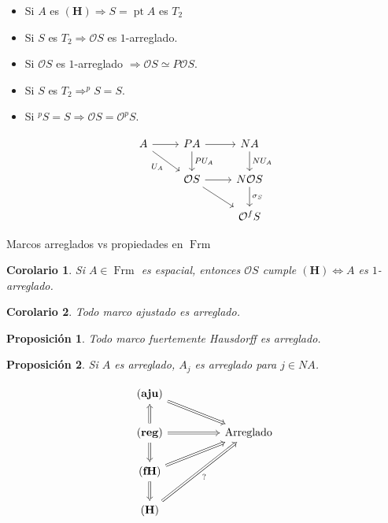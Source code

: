 \documentclass[compress,12pt]{beamer}
\DeclareMathOperator{\pt}{pt}
\DeclareMathOperator{\Frm}{Frm}
\newtheorem{cor}{Corolario}
\newtheorem{prop}{Proposición}
\begin{document}
\begin{frame}[fragile]
\begin{itemize}
\item Si $A$ es $\mathbf{(H)}\Rightarrow S=\pt A$ es $T_2$
\item Si $S$ es $T_2\Rightarrow \mathcal{O}S$ es $1$-arreglado.
\item Si $\mathcal{O}S$ es $1$-arreglado $\Rightarrow \mathcal{O}S\simeq P\mathcal{O}S$.
\item Si $S$ es $T_2\Rightarrow ^pS=S$.
\item Si $^pS=S\Rightarrow \mathcal{O}S=\mathcal{O}^pS$.
\end{itemize}
\[\begin{tikzcd}
	A & PA & NA \\
	& {\mathcal{O}S} & {N\mathcal{O}S} \\
	&& {\mathcal{O}^fS}
	\arrow[from=1-1, to=1-2]
	\arrow["{U_A}"', from=1-1, to=2-2]
	\arrow[from=1-2, to=1-3]
	\arrow["{PU_A}", from=1-2, to=2-2]
	\arrow["{NU_A}", from=1-3, to=2-3]
	\arrow[from=2-2, to=2-3]
	\arrow[from=2-2, to=3-3]
	\arrow["{\sigma_S}", from=2-3, to=3-3]
\end{tikzcd}\]
\end{frame}

\begin{frame}{Marcos arreglados vs propiedades en $\Frm$}
\begin{cor}
Si $A\in \Frm$ es espacial, entonces $\mathcal{O}S$ cumple $\mathbf{(H)}\Leftrightarrow A$ es $1$-arreglado.
\end{cor}

\begin{cor}
	Todo marco ajustado es arreglado.
\end{cor}

\begin{prop}
Todo marco fuertemente Hausdorff es arreglado.
\end{prop}

\begin{prop}
Si $A$ es arreglado, $A_j$ es arreglado para $j\in NA$.
\end{prop}

\end{frame}

\begin{frame}[fragile]
\[\begin{tikzcd}
	{\mathbf{(aju)}} \\
	{\mathbf{(reg)}} && {\mbox{Arreglado}} \\
	{\mathbf{(fH)}} \\
	{\mathbf{(H)}}
	\arrow[Rightarrow, from=1-1, to=2-3]
	\arrow[Rightarrow, from=2-1, to=1-1]
	\arrow[Rightarrow, from=2-1, to=2-3]
	\arrow[Rightarrow, from=2-1, to=3-1]
	\arrow[Rightarrow, from=3-1, to=2-3]
	\arrow[Rightarrow, from=3-1, to=4-1]
	\arrow["{?}"', Rightarrow, from=4-1, to=2-3]
\end{tikzcd}\]
\end{frame}
\end{document}
